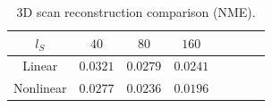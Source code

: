 \begin{table}[t!]
\footnotesize
\caption{\small{3D scan reconstruction comparison (NME).}} 
\label{tab:shape_representation_number}
\vspace{-6mm}
\begin{center}
\begin{tabular}{ cccccccc}
\toprule 
$l_S$     & $40$ & $80$ & $160$ \\ \midrule
Linear    & $0.0321$ & $0.0279$ & $0.0241$ \\
Nonlinear & $0.0277$ & $0.0236$ & $\mathbf{0.0196}$ \\
\bottomrule
\end{tabular}
\end{center}
\figvspace
\end{table}



